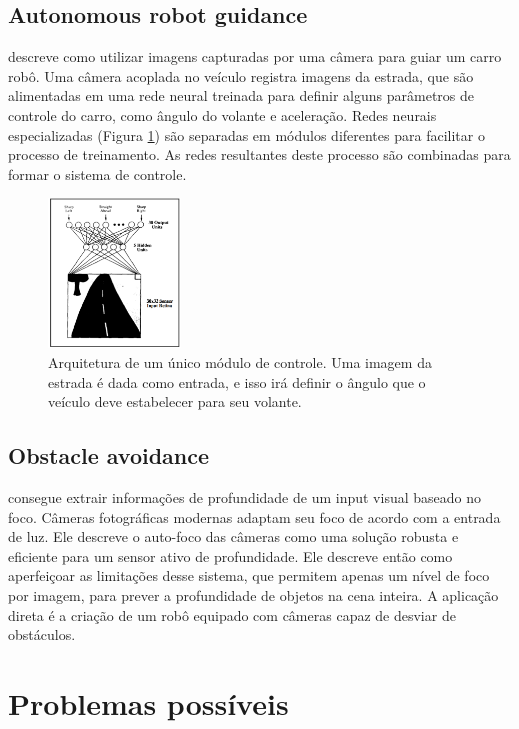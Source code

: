 \documentclass{article}
\begin{document}
\subsection{Autonomous robot guidance}
 descreve como utilizar imagens capturadas por uma câmera para guiar um carro robô. Uma câmera acoplada no veículo registra imagens da estrada, que são alimentadas em uma rede neural treinada para definir alguns parâmetros de controle do carro, como ângulo do volante e aceleração. Redes neurais especializadas (Figura \ref{fig:pormeleau:fig1}) são separadas em módulos diferentes para facilitar o processo de treinamento. As redes resultantes deste processo são combinadas para formar o sistema de controle.

\begin{figure}[ht]
  \centering
  \includegraphics[height=150px]{images/pormeleau_arch.png}
  \caption{Arquitetura de um único módulo de controle. Uma imagem da estrada é dada como entrada, e isso irá definir o ângulo que o veículo deve estabelecer para seu volante.}
  \label{fig:pormeleau:fig1}
\end{figure}

\subsection{Obstacle avoidance}
 consegue extrair informações de profundidade de um input visual baseado no foco. Câmeras fotográficas modernas adaptam seu foco de acordo com a entrada de luz. Ele descreve o auto-foco das câmeras como uma solução robusta e eficiente para um sensor ativo de profundidade. Ele descreve então como aperfeiçoar as limitações desse sistema, que permitem apenas um nível de foco por imagem, para prever a profundidade de objetos na cena inteira. A aplicação direta é a criação de um robô equipado com câmeras capaz de desviar de obstáculos.

\section{Problemas possíveis}
\end{document}

